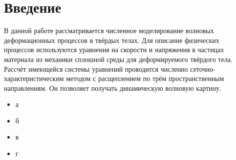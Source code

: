\section*{Введение}
В данной работе рассматривается численное моделирование волновых деформационных процессов в твёрдых телах. Для описание физических процессов используются уравнения на скорости и напряжения в частицах материала из механики сплошной среды для деформируемого твёрдого тела. Рассчёт имеющейся системы уравнений проводится численно сеточно-характеристическим методом с расщеплением по трём пространственным направлениям. Он позволяет получать динамическую волновую картину.


\begin{itemize}
\item а
\item б
\item в
\item г
\end{itemize}

